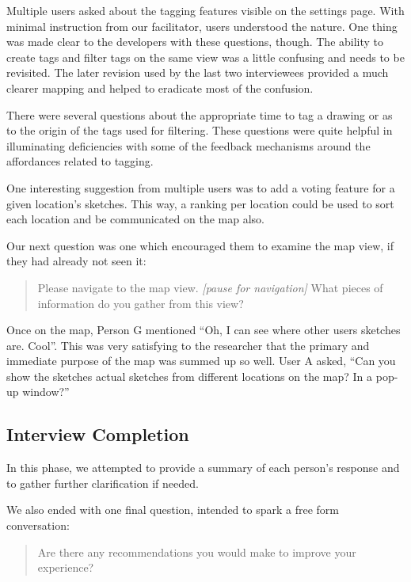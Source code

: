 \documentclass{chi2009}
\begin{document}
Multiple users asked about the tagging features visible on the settings page.
With minimal instruction from our facilitator, users understood the nature.
One thing was made clear to the developers with these questions, though.  The
ability to create tags and filter tags on the same view was a little confusing
and needs to be revisited.  The later revision used by the last two
interviewees provided a much clearer mapping and helped to eradicate most of
the confusion.

There were several questions about the appropriate time to tag a drawing or as
to the origin of the tags used for filtering.  These questions were quite
helpful in illuminating deficiencies with some of the feedback mechanisms
around the affordances related to tagging.

One interesting suggestion from multiple users was to add a voting feature for
a given location's sketches.  This way, a ranking per location could be used to
sort each location and be communicated on the map also.

Our next question was one which encouraged them to examine the map view, if
they had already not seen it:

\begin{quote}
Please navigate to the map view. {\it [pause for navigation]}
What pieces of information do you gather from this view?
\end{quote}

Once on the map, Person G mentioned ``Oh, I can see where other users sketches
are.  Cool''.  This was very satisfying to the researcher that the primary and
immediate purpose of the map was summed up so well.  User A asked, ``Can you
show the sketches actual sketches from different locations on the map? In a
pop-up window?''


\subsection{Interview Completion}

In this phase, we attempted to provide a summary of each person's response and
to gather further clarification if needed.

We also ended with one final question, intended to spark a free form conversation:

\begin{quote}
Are there any recommendations you would make to improve your experience?
\end{quote}
\end{document}
